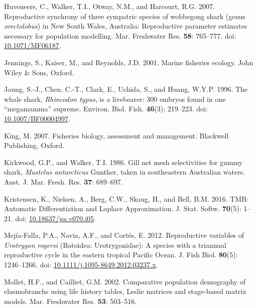\documentclass[
]{article}
\newenvironment{CSLReferences}%
  {}%
  {\par}
\begin{document}
\begin{CSLReferences}{1}{0}
Huveneers, C., Walker, T.I., Otway, N.M., and Harcourt, R.G. 2007. Reproductive synchrony of three sympatric species of wobbegong shark (genus \emph{orectolobus}) in {New} {South} {Wales}, {Australia}: Reproductive parameter estimates necessary for population modelling. Mar. Freshwater Res. \textbf{58}: 765--777. doi: \href{https://doi.org/10.1071/MF06187}{10.1071/MF06187}.

Jennings, S., Kaiser, M., and Reynolds, J.D. 2001. Marine fisheries ecology. John Wiley \& Sons, Oxford.

Joung, S.-J., Chen, C.-T., Clark, E., Uchida, S., and Huang, W.Y.P. 1996. The whale shark, \emph{{Rhincodon} typus}, is a livebearer: 300 embryos found in one {``megamamma''} supreme. Environ. Biol. Fish. \textbf{46}(3): 219--223. doi: \href{https://doi.org/10.1007/BF00004997}{10.1007/BF00004997}.

King, M. 2007. Fisheries biology, assessment and management. Blackwell Publishing, Oxford.

Kirkwood, G.P., and Walker, T.I. 1986. Gill net mesh selectivities for gummy shark, \emph{{Mustelus} antarcticus} {Gunther}, taken in southeastern {Australian} waters. Aust. J. Mar. Fresh. Res. \textbf{37}: 689--697.

Kristensen, K., Nielsen, A., Berg, C.W., Skaug, H., and Bell, B.M. 2016. {TMB}: {Automatic} {Differentiation} and {Laplace} {Approximation}. J. Stat. Softw. \textbf{70}(5): 1--21. doi: \href{https://doi.org/10.18637/jss.v070.i05}{10.18637/jss.v070.i05}.

Mejía‐Falla, P.A., Navia, A.F., and Cortés, E. 2012. Reproductive variables of \emph{{Urotrygon} rogersi} ({Batoidea}: {Urotrygonidae}): A species with a triannual reproductive cycle in the eastern tropical {Pacific} {Ocean}. J. Fish Biol. \textbf{80}(5): 1246--1266. doi: \href{https://doi.org/10.1111/j.1095-8649.2012.03237.x}{10.1111/j.1095-8649.2012.03237.x}.

Mollet, H.F., and Cailliet, G.M. 2002. Comparative population demography of elasmobranchs using life history tables, {Leslie} matrices and stage-based matrix models. Mar. Freshwater Res. \textbf{53}: 503--516.


\end{CSLReferences}
\end{document}
